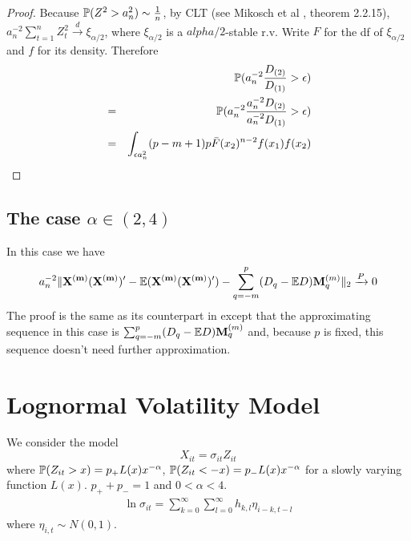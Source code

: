 \documentclass{article}
\begin{document}
\begin{proof}
  Because $\mathbb{P}(Z^2 > a_n^2) \sim {1 \over n}$, by CLT (see Mikosch et
  al \cite{Embrechts1997}, theorem 2.2.15), $a_n^{-2} \sum_{t=1}^n
  Z_t^2 \xrightarrow{d} \xi_{\alpha/2}$, where $\xi_{\alpha/2}$ is a
  $alpha/2$-stable r.v. Write $F$ for the df of
  $\xi_{\alpha/2}$ and $f$ for its density. Therefore
  \begin{eqnarray*}
    && \mathbb{P}(a_n^{-2} {D_{(2)} \over D_{(1)}} > \epsilon) \\
    &=& \mathbb{P}(a_n^{-2} {a_n^{-2} D_{(2)} \over a_n^{-2} D_{(1)}} >
    \epsilon) \\
    &=& \int_{\epsilon a_n^2} (p-m+1)p \bar{F}(x_2)^{n-2} f(x_1)
    f(x_2) 
  \end{eqnarray*}
\end{proof}


\subsection[alpha in (2,4)]{The case $\alpha \in (2,4)$}
In this case we have
\[
a_n^{-2} \|\mathbf{X^{(m)} (X^{(m)})'} - \mathbb{E}(\mathbf{X^{(m)} (X^{(m)})'}) -
\sum_{q=-m}^p (D_q - \mathbb{E} D) \mathbf{M}_q^{(m)}\|_2
\xrightarrow{P} 0
\]
The proof is the same as its counterpart in \cite{Mikosch2014} except
that the approximating sequence in this case is $\sum_{q=-m}^p (D_q -
\mathbb{E} D) \mathbf{M}_q^{(m)}$ and, because $p$ is fixed, this sequence doesn't
need further approximation.

\section{Lognormal Volatility Model}
We consider the model
\[
X_{it} = \sigma_{it} Z_{it}
\]
where $\mathbb{P}(Z_{it} > x) = p_+ L(x) x^{-\alpha}$, $\mathbb{P}(Z_{it} < -x) =
p_- L(x) x^{-\alpha}$ for a slowly varying function $L(x)$. $p_+ +
p_- = 1$ and $0 < \alpha < 4$.
\begin{eqnarray*}
  \ln \sigma_{it} = \sum_{k=0}^\infty \sum_{l=0}^\infty h_{k,l}
  \eta_{i-k,t-l}
\end{eqnarray*}
where $\eta_{i,t} \sim N(0, 1)$.



\end{document}
